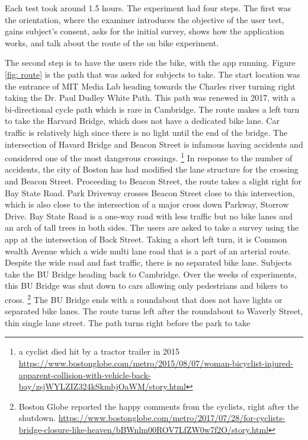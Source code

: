 Each test took around 1.5 hours. The experiment had four steps. The first
was the orientation, where the examiner introduces the objective of the
user test, gains subject's consent, asks for the initial survey, shows how
the application works, and talk about the route of the on bike experiment.

The second step is to have the users ride the bike, with the app running.
Figure \ref{fig: route} is the path that was asked for subjects to take.
The start location was the entrance of MIT Media Lab heading towards the
Charles river turning right taking the Dr. Paul Dudley White Path. This
path was renewed in 2017, with a bi-directional cycle path which is rare in
Cambridge. The route makes a left turn to take the Harvard Bridge, which
does not have a dedicated bike lane. Car traffic is relatively high since
there is no light until the end of the bridge. The intersection of Havard
Bridge and Beacon Street is infamous having accidents and considered one of
the most dangerous crossings. 
\footnote{a cyclist died hit by a tractor trailer in 2015
\url{https://www.bostonglobe.com/metro/2015/08/07/woman-bicyclist-injured-apparent-collision-with-vehicle-back-bay/zsjWYLZIZ324kSkmbjOaWM/story.html}}
In response to the number of accidents, the city of Boston has had modified
the lane structure for the crossing and Beacon Street. Proceeding to Beacon
Street, the route takes a slight right for Bay State Road. Park Driveway
crosses Beacon Street close to this intersection, which is also close to
the intersection of a major cross down Parkway, Storrow Drive. Bay State
Road is a one-way road with less traffic but no bike lanes and an arch of
tall trees in both sides. The users are asked to take a survey using the
app at the intersection of Back Street. Taking a short left turn, it is
Common wealth Avenue which a wide multi lane road that is a part of an
arterial route. Despite the wide road and fast traffic, there is no
separated bike lane. Subjects take the BU Bridge heading back to Cambridge.
Over the weeks of experiments, this BU Bridge was shut down to cars
allowing only pedestrians and bikers to cross.
\footnote{Boston Globe reported the happy comments from the cyclists, right
  after the shutdown. \url{https://www.bostonglobe.com/metro/2017/07/28/for-cyclists-bridge-closure-like-heaven/bBWnlm00ROV7LfZW0w7f2O/story.html}}
The BU Bridge ends with a roundabout that does not have lights or separated
bike lanes. The route turns left after the roundabout to Waverly Street,
thin single lane street. The path turns right before the park to take
